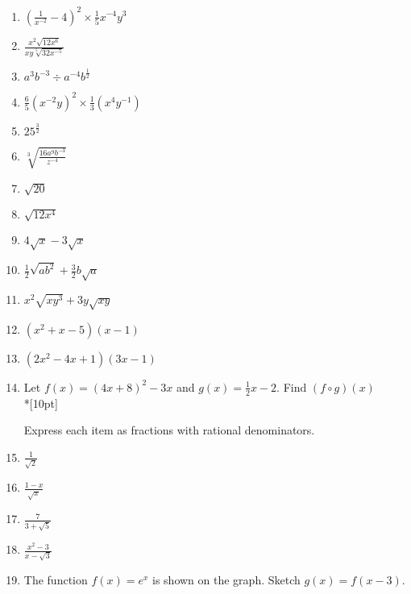 \documentclass[]{book}
\begin{document}
\begin{enumerate}
\begin{figure}[!htbp]
\begin{center}
\begin{tikzpicture}
      \end{tikzpicture}
      \end{center}
    \end{figure}

\newpage

\item $\displaystyle (\frac{1}{x^{-2}}-4)^2 \times \frac{1}{5}x^{-4} y^{3}$
\item $\displaystyle  \frac{x^2 \sqrt{12x^6}}{xy \sqrt[5]{32x^{-5}}}$
\item $a^3 b^{-3} \div a^{-4} b^{\frac{1}{2}}$
\item $\displaystyle \frac{6}{5} (x^{-2} y)^2 \times \frac{1}{3}(x^4 y^{-1})$
\item $\displaystyle  25^\frac{3}{2}$
\item $\displaystyle  \sqrt[3]{\frac{16a^9 b^{-3}}{z^{-4}}}$

\item $\sqrt{20}$
\item $\sqrt{12x^4}$

\item $4\sqrt{x}-3\sqrt{x}$
\item $\frac{1}{2}\sqrt{ab^2}+\frac{3}{2}b\sqrt{a}$
\item $x^2 \sqrt{xy^3}+3y\sqrt{xy}$

\item $(x^2+x-5)(x-1)$
\item $(2x^2-4x+1)(3x-1)$

\item Let $f(x) = (4x+8)^2 - 3x$ and $g(x)=\frac{1}{2}x-2$. Find $(f \circ g) (x)$\\*[10pt]

Express each item as fractions with rational denominators.
\item $\displaystyle   \frac{1}{\sqrt{2}}$
\item $\displaystyle  \frac{1-x}{\sqrt{x}}$
\item $\displaystyle  \frac{7}{3+\sqrt{5}}$
\item $\displaystyle  \frac{x^2-3}{x-\sqrt{3}}$

\newpage

\item The function $f(x)=e^x$ is shown on the graph. Sketch $g(x)=f(x-3)$.

\begin{figure}[!htbp]
\begin{center}
\begin{tikzpicture}


\end{tikzpicture}
\end{center}
\end{figure}
\end{enumerate}
\end{document}
